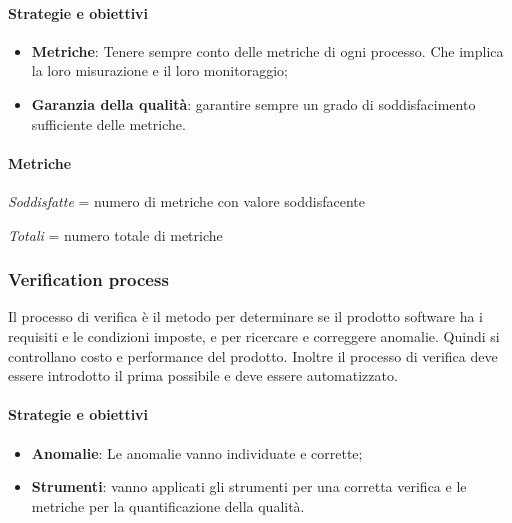             \paragraph{Strategie e obiettivi}
            \begin{itemize}
                \item \textbf{Metriche}: Tenere sempre conto delle metriche di ogni processo. Che implica la loro misurazione e il loro monitoraggio;
                \item \textbf{Garanzia della qualità}: garantire sempre un grado di soddisfacimento sufficiente delle metriche.
            \end{itemize}
            
            \paragraph{Metriche}
            \hphantom{}
            \def\productquality{
                {   Percentuale di metriche soddisfatte,
                    $\frac{Soddisfatte}{Totali}$,
                    $ \geq 60 \%$,
                    $ \geq 80 \% $
                },
            }
            
            
\textit{Soddisfatte} = numero di metriche con valore soddisfacente

\textit{Totali} = numero totale di metriche
 
            \newpage
            \subsubsection{Verification process}
            Il processo di verifica è il metodo per determinare se il prodotto software ha i requisiti e le condizioni imposte, e per ricercare e correggere anomalie. Quindi si controllano costo e performance del prodotto. Inoltre il processo di verifica deve essere introdotto il prima possibile e deve essere automatizzato.
            
            \paragraph{Strategie e obiettivi}
            \begin{itemize}
                \item \textbf{Anomalie}: Le anomalie vanno individuate e corrette;
                \item \textbf{Strumenti}: vanno applicati gli strumenti per una corretta verifica e le metriche per la quantificazione della qualità.
            \end{itemize}
            
